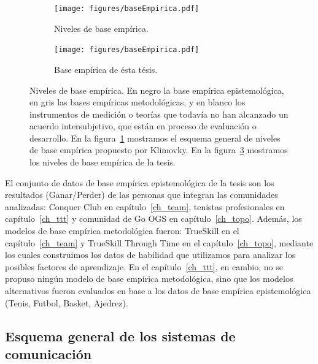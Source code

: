 \documentclass[a4paper,11pt]{book}
\theoremstyle{definition}
\begin{document}
\begin{figure}[ht!]
    \centering
    \begin{subfigure}[b]{0.45\textwidth}
    \texttt{[image: figures/baseEmpirica.pdf]}
    \caption{Niveles de base emp\'irica.}
    \label{fig_base_empirica_general}
    \end{subfigure}
    \hfill
    \begin{subfigure}[b]{0.45\textwidth}
    \texttt{[image: figures/baseEmpirica.pdf]}
    \caption{Base emp\'irica de \'esta t\'esis.}
    \label{fig_base_empirica_tesis}
    \end{subfigure}
    \caption{Niveles de base emp\'irica. En negro la base emp\'irica epistemol\'ogica, en gris las bases emp\'iricas metodol\'ogicas, y en blanco los instrumentos de medici\'on o teor\'ias que todav\'ia no han alcanzado un acuerdo intersubjetivo, que est\'an en proceso de evaluaci\'on o desarrollo.
    En la figura~\ref{fig_base_empirica_general} mostramos el esquema general de niveles de base emp\'irica propuesto por Klimovky.
    En la figura~\ref{fig_base_empirica_tesis} mostramos los niveles de base emp\'irica de la tesis.
       }
\end{figure}
%
El conjunto de datos de base emp\'irica epistemol\'ogica de la tesis son los resultados (Ganar/Perder) de las personas que integran las comunidades analizadas: Conquer Club en cap\'itulo~\ref{ch_team}, tenistas profesionales en cap\'itulo~\ref{ch_ttt} y comunidad de Go OGS en cap\'itulo~\ref{ch_topo}.
%
Adem\'as, los modelos de base emp\'irica metodol\'ogica fueron: TrueSkill en el cap\'itulo~\ref{ch_team} y TrueSkill Through Time en el cap\'itulo~\ref{ch_topo}, mediante los cuales construimos los datos de habilidad que utilizamos para analizar los posibles factores de aprendizaje.
%
En el cap\'itulo~\ref{ch_ttt}, en cambio, no se propuso ning\'un modelo de base emp\'irica metodol\'ogica, sino que los modelos alternativos fueron evaluados en base a los datos de base emp\'irica epistemol\'ogica (Tenis, Futbol, Basket, Ajedrez).



\subsection{Esquema general de los sistemas de comunicaci\'on} \label{sec:estructura_invariante}
\end{document}
